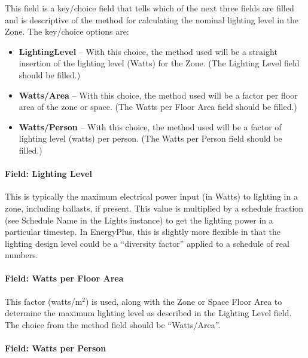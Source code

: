 This field is a key/choice field that tells which of the next three fields are filled and is descriptive of the method for calculating the nominal lighting level in the Zone. The key/choice options are:

\begin{itemize}
\tightlist
\item
  \textbf{LightingLevel} -- With this choice, the method used will be a straight insertion of the lighting level (Watts) for the Zone. (The Lighting Level field should be filled.)
\item
  \textbf{Watts/Area} -- With this choice, the method used will be a factor per floor area of the zone or space. (The Watts per Floor Area field should be filled.)
\item
  \textbf{Watts/Person} -- With this choice, the method used will be a factor of lighting level (watts) per person. (The Watts per Person field should be filled.)
\end{itemize}

\paragraph{Field: Lighting Level}\label{field-lighting-level-lights-definition}

This is typically the maximum electrical power input (in Watts) to lighting in a zone, including ballasts, if present. This value is multiplied by a schedule fraction (see Schedule Name in the Lights instance) to get the lighting power in a particular timestep. In EnergyPlus, this is slightly more flexible in that the lighting design level could be a ``diversity factor'' applied to a schedule of real numbers.

\paragraph{Field: Watts per Floor Area}\label{field-watts-per-zone-floor-area-lights-definition}

This factor (watts/m\(^{2}\)) is used, along with the Zone or Space Floor Area to determine the maximum lighting level as described in the Lighting Level field. The choice from the method field should be ``Watts/Area''.

\paragraph{Field: Watts per Person}\label{field-watts-per-person-lights-definition}

